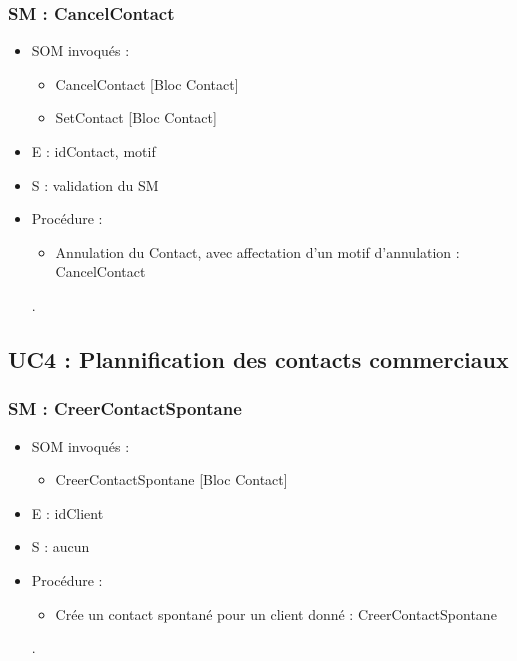 \subsubsection{SM : CancelContact}
\begin{itemize}
	\item SOM invoqués : 
		\begin{itemize}
			\item CancelContact [Bloc Contact]
			\item SetContact [Bloc Contact]
		\end{itemize}
	\item E : idContact, motif
	\item S : validation du SM
	\item Procédure : 
		\begin{itemize}
			\item Annulation du Contact, avec affectation d’un motif d’annulation : CancelContact
		\end{itemize}.
\end{itemize}



\subsection{UC4 : Plannification des contacts commerciaux}

\subsubsection{SM : CreerContactSpontane}
\begin{itemize}
	\item SOM invoqués : 
		\begin{itemize}
			\item CreerContactSpontane [Bloc Contact]
		\end{itemize}
	\item E : idClient
	\item S : aucun
	\item Procédure : 
		\begin{itemize}
			\item Crée un contact spontané pour un client donné : CreerContactSpontane
		\end{itemize}.
\end{itemize}

